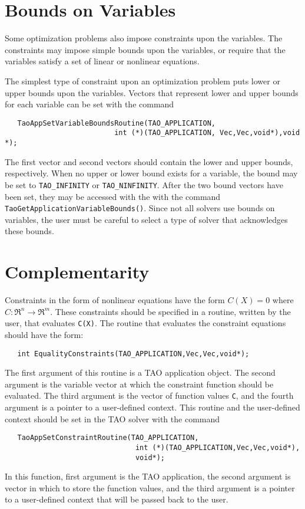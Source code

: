 \section{Bounds on Variables}\label{sec:bounds}

Some optimization problems also impose constraints upon the variables.
The constraints may impose simple bounds upon the variables, or
require that the variables satisfy a set of linear or  nonlinear equations.

The simplest type of constraint upon an optimization problem puts lower
or upper bounds upon the variables. 
Vectors that represent lower and upper bounds for each variable 
can be set with the command  
\begin{verbatim}
   TaoAppSetVariableBoundsRoutine(TAO_APPLICATION, 
                          int (*)(TAO_APPLICATION, Vec,Vec,void*),void *);
\end{verbatim}
\noindent
The first vector and second vectors should contain the lower and upper 
bounds, respectively.
When no upper or lower bound exists for a variable, the bound
may be set to {\tt TAO\_INFINITY} or {\tt TAO\_NINFINITY}.
After the two bound vectors have been set, they may be accessed with the
with the command  {\tt TaoGetApplicationVariableBounds()}.
Since not all solvers use bounds on variables, the user must be careful 
to select a type of solver that acknowledges these bounds.

\section{Complementarity}\label{sec:constraints}

Constraints in the form of nonlinear equations have the form
$C(X) = 0$ where $C: \Re^n \to \Re^m$.
These constraints should be specified in a 
routine, written by the user, that evaluates {\tt C(X)}.
The routine that evaluates the constraint equations should have the form:
\begin{verbatim}
   int EqualityConstraints(TAO_APPLICATION,Vec,Vec,void*);
\end{verbatim}
\noindent
The first argument of this routine is a TAO application object.  The second argument
is the variable vector at which the constraint function should be evaluated.  
The third argument is the vector of function values {\tt C}, and the fourth
argument is a pointer to a user-defined context.
This routine  and the user-defined context 
should be set in the TAO solver with the command
\begin{verbatim}
   TaoAppSetConstraintRoutine(TAO_APPLICATION,
                               int (*)(TAO_APPLICATION,Vec,Vec,void*),
                               void*);
\end{verbatim}
\noindent
In this function, first argument is the TAO application,
the second argument is vector in which to store the function values,
and the third argument is a pointer to a user-defined context that will
be passed back to the user.

